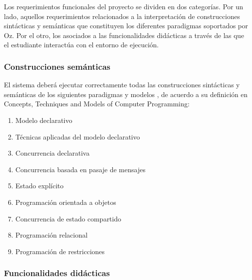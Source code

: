 \documentclass[a4paper,11pt]{article}
\begin{document}
Los requerimientos funcionales del proyecto se dividen en dos categorías. Por
un lado, aquellos requerimientos relacionados a la interpretación de
construcciones sintácticas y semánticas que constituyen los diferentes
paradigmas soportados por Oz. Por el otro, los asociados a las funcionalidades
didácticas a través de las que el estudiante interactúa con el entorno de
ejecución.

\subsubsection{Construcciones semánticas}

El sistema deberá ejecutar correctamente todas las construcciones sintácticas y
semánticas de los siguientes paradigmas y modelos , de acuerdo a su definición
en Concepts, Techniques and Models of Computer Programming:

\begin{enumerate}

  \item Modelo declarativo \cite[cap.2]{ctmcp}

  \item Técnicas aplicadas del modelo declarativo \cite[cap.3]{ctmcp}

  \item Concurrencia declarativa \cite[cap.4]{ctmcp}

  \item Concurrencia basada en pasaje de mensajes \cite[cap.5]{ctmcp}

  \item Estado explícito \cite[cap.6]{ctmcp}

  \item Programación orientada a objetos \cite[cap.7]{ctmcp}

  \item Concurrencia de estado compartido \cite[cap.8]{ctmcp}

  \item Programación relacional \cite[cap.9]{ctmcp}

  \item Programación de restricciones \cite[cap.12]{ctmcp}

\end{enumerate}

\subsubsection{Funcionalidades didácticas}
\end{document}
